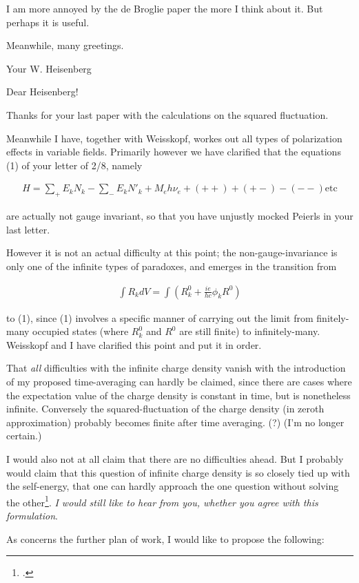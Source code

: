\documentclass{article}
\newcommand{\nequ}[2]{
\begin{align*}
#1
\tag{#2}
\end{align*}
}
\newcommand{\sumX}[1]{\underset{#1}{\sum}}
\begin{document}
I am more annoyed by the de Broglie paper the more I think about it. But perhaps it is useful.

Meanwhile, many greetings. 

Your W. Heisenberg

\date{February 17, 1934}

Dear Heisenberg!

Thanks for your last paper with the calculations on the squared fluctuation.

Meanwhile I have, together with Weisskopf, workes out all types of polarization effects in variable fields. Primarily however we have clarified that the equations (1) of your letter of 2/8, namely
\nequ{
H = \sumX{+}E_k N_k - \sumX{-}E_k {N'}_k + M_e h\nu_e + (++) + (+-) - (--) \text{etc}
}{1}
are actually not gauge invariant, so that you have unjustly mocked Peierls in your last letter.

However it is not an actual difficulty at this point; the non-gauge-invariance is only one of the infinite types of paradoxes, and emerges in the transition from
\nequ{
\int R_k {dV} = \int\left(R^0_k + \frac{ie}{hc}\phi_k R^0 \right){}
}{III}
to (1), since (1) involves a specific manner of carrying out the limit from finitely-many occupied states (where $R^0_k$ and $R^0$ are still finite) to infinitely-many. Weisskopf and I have clarified this point and put it in order.

That \textit{all} difficulties with the infinite charge density vanish with the introduction of my proposed time-averaging can hardly be claimed, since there are cases where the expectation value of the charge density is constant in time, but is nonetheless infinite. Conversely the squared-fluctuation of the charge density (in zeroth approximation) probably becomes finite after time averaging. (?) (I'm no longer certain.)

I would also not at all claim that there are no difficulties ahead. But I probably would claim that this question of infinite charge density is so closely tied up with the self-energy, that one can hardly approach the one question without solving the other\footnote{.}. \textit{I would still like to hear from you, whether you agree with this formulation}.

As concerns the further plan of work, I would like to propose the following:
\end{document}
